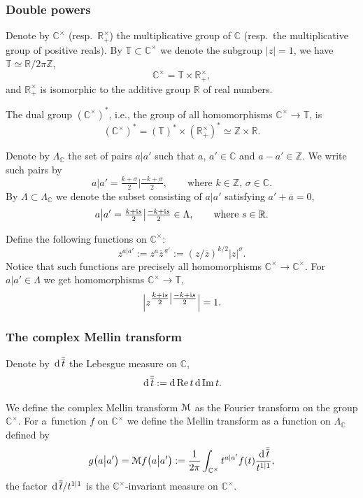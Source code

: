 \documentclass[pdftex]{sigma}
\numberwithin{equation}{section}
\renewcommand{\Re}{\mathop {\mathrm {Re}}\nolimits}
\def\ov{\overline}
\renewcommand{\Re}{\mathop {\mathrm {Re}}\nolimits}
\renewcommand{\Im}{\mathop {\mathrm {Im}}\nolimits}
\def\R {{\mathbb R }}
\def\C {{\mathbb C }}
\def\Z{{\mathbb Z}}
\def\T{\mathbb T}
\def\cM{\EuScript M}
\newcommand{\dd}[1]{\,{\rm d}\,{\overline{\overline{#1}}} }
\begin{document}
\subsubsection{Double powers}
Denote by $\C^\times$ (resp.\ $\R^\times_+$) the multiplicative group of $\C$
(resp.\ the multiplicative group of positive reals).
By $\T\subset \C^\times$ we denote the subgroup
$|z|=1$, we have $\T\simeq\R/2\pi \Z$,
\begin{equation*}
\C^\times= \T\times \R^\times_+,
\end{equation*}
and $\R^\times_+$ is isomorphic to the additive group $\R$ of real numbers.

The dual group $(\C^\times)^*$, i.e., the group of all homomorphisms
$\C^\times\to \T$, is
\begin{equation*}
(\C^\times)^*= (\T)^*\times (\R^\times_+)^*\simeq \Z\times \R.
\end{equation*}

Denote by $\Lambda_\C$ the set of pairs
$a\big| a'$ such that $a$, $a'\in\C$ and $a-a'\in\Z$.
We write such pairs by
\[
a\big|a'=\tfrac{k+\sigma}2\big|\tfrac{-k+\sigma}2,
\qquad\text{where $k\in\Z$, $\sigma\in\C$}.
\]
By $\Lambda\subset \Lambda_\C$ we denote the subset
consisting of $a|a'$ satisfying $a'+\ov a=0$,
\[
a\big|a'=
\tfrac{k+{\rm i}s}2\big|\tfrac{-k+{\rm i}s}2\in \Lambda,\qquad\text{where $s\in \R$}.
\]

Define the following functions on $\C^\times$:
\[
z^{a|a'}:= z^a \ov z^{\,a'}:= (z/\ov z)^{k/2} |z|^{\sigma}.
\]
Notice that such functions are precisely all homomorphisms
$\C^\times\to \C^\times$.
For $a|a'\in \Lambda$ we get homomorphisms $\C^\times\to \T$,
\[
\Big|z^{\tfrac{k+{\rm i}s}2\big|\tfrac{-k+{\rm i}s}2} \Big|=1.
\]

\subsubsection{The complex Mellin transform}
Denote by $\dd t$ the Lebesgue measure on $\C$,
\[
\dd t:= {\rm d}\Re t\, {\rm d}\Im t.
\]

We define the complex Mellin transform $\cM$ as the Fourier transform on the group $\C^\times$.
For a~function $f$ on $\C^\times$ we define the Mellin transform as a function
on $\Lambda_\C$ defined by
\[
g\big(a\big|a'\big)=
\cM f\big(a\big|a'\big):=\frac 1{2\pi}
\int_{\C^\times} t^{a|a'} f(t)\frac {\dd t}{t^{1|1}},
\]
the factor ${\dd t}/{t^{1|1}}$ is the $\C^\times$-invariant measure on $\C^\times$.
\end{document}
